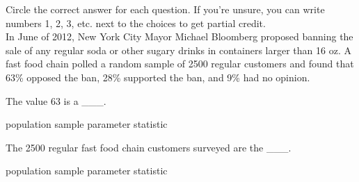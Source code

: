 \documentclass{article}
\begin{document}
	Circle the correct answer for each question.  If you're unsure, you can write numbers 1, 2, 3, etc. next to the choices to get partial credit.\\[.5cm]
	
	In June of 2012, New York City Mayor Michael Bloomberg proposed banning the sale of any regular soda or other sugary drinks in containers larger than 16 oz. A fast food chain polled a random sample of 2500 regular customers and found that 63\% opposed the ban, 28\% supported the ban, and 9\% had no opinion.
	\begin{mcquestions}		
		\question The value 63 is a \_\_\_.
		
		\begin{mcanswerslist}
			\answer population
			\answer sample
			\answer parameter
			\answer[correct] statistic
		\end{mcanswerslist}
		
		\question The 2500 regular fast food chain customers surveyed are the \_\_\_.
		
		\begin{mcanswerslist}
			\answer population
			\answer[correct] sample
			\answer parameter
			\answer statistic
		\end{mcanswerslist}
		
	\end{mcquestions}
\end{document}
